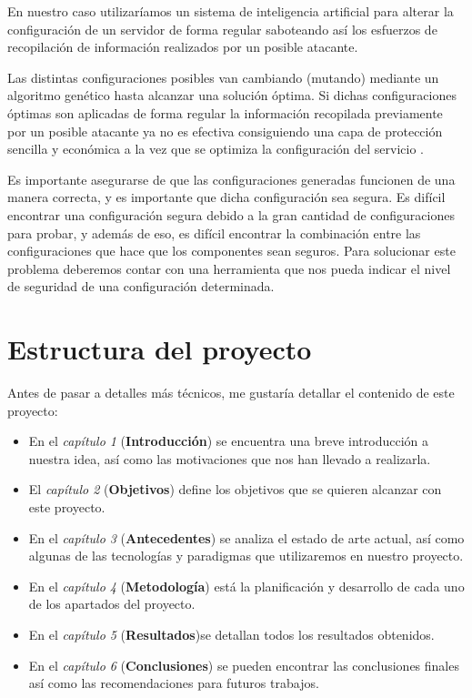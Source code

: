 \bigskip
En nuestro caso utilizaríamos un sistema de inteligencia artificial \cite{tribak_alisis_2012} para alterar la configuración de un servidor de forma regular saboteando así los esfuerzos de recopilación de información realizados por un posible atacante.

\bigskip
Las distintas configuraciones posibles van cambiando (mutando) mediante un algoritmo genético hasta alcanzar una solución óptima. Si dichas configuraciones óptimas son aplicadas de forma regular la información recopilada previamente por un posible atacante ya no es efectiva consiguiendo una capa de protección sencilla y económica a la vez que se optimiza la configuración del servicio \cite{john_evolutionary_2014}.

\bigskip
Es importante asegurarse de que las configuraciones generadas funcionen de una manera correcta, y es importante que dicha configuración sea segura. Es difícil encontrar una configuración segura debido a la gran cantidad de configuraciones para probar, y además de eso, es difícil encontrar la combinación entre las configuraciones que hace que los componentes sean seguros. Para solucionar este problema deberemos contar con una herramienta que nos pueda indicar el nivel de seguridad de una configuración determinada.


\section{Estructura del proyecto}

\bigskip
Antes de pasar a detalles más técnicos, me gustaría detallar el contenido de este proyecto:

\begin{itemize}
  \item En el \textit{capítulo 1} (\textbf{Introducción}) se encuentra una breve introducción a nuestra idea, así como las motivaciones que nos han llevado a realizarla.
  \item El \textit{capítulo 2} (\textbf{Objetivos}) define los objetivos que se quieren alcanzar con este proyecto.
  \item En el \textit{capítulo 3} (\textbf{Antecedentes}) se analiza el estado de arte actual, así como algunas de las tecnologías y paradigmas que utilizaremos en nuestro proyecto.
  \item En el \textit{capítulo 4} (\textbf{Metodología}) está la planificación y desarrollo de cada uno de los apartados del proyecto.
  \item En el \textit{capítulo 5} (\textbf{Resultados})se detallan todos los resultados obtenidos.
  \item En el \textit{capítulo 6} (\textbf{Conclusiones}) se pueden encontrar las conclusiones finales  así como las recomendaciones para futuros trabajos.

\end{itemize}

